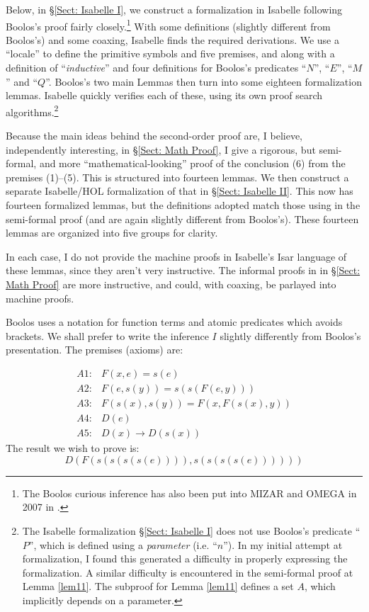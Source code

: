 \documentclass[11pt,a4paper]{article}
\newcommand{\ben}{\begin{equation*}}
\newcommand{\een}{\end{equation*}}
\newcommand{\beqn}{\begin{eqnarray*}}
\newcommand{\eeqn}{\end{eqnarray*}}
\theoremstyle{definition}
\begin{document}
Below, in \S \ref{Sect: Isabelle I}, we construct a formalization in Isabelle following Boolos's proof fairly closely.\footnote{The Boolos curious inference has also been put into MIZAR and OMEGA in 2007 in \cite{ben07}.} With some definitions (slightly different from Boolos's) and some coaxing, Isabelle finds the required derivations. We use a ``locale'' to define the primitive symbols and five premises, and along with a definition of ``\emph{inductive}'' and four definitions for Boolos's predicates ``$N$'', ``$E$'', ``$M$'' and ``$Q$''. Boolos's two main Lemmas then turn into some eighteen formalization lemmas. Isabelle quickly verifies each of these, using its own proof search algorithms.\footnote{The Isabelle formalization \S \ref{Sect: Isabelle I} does not use Boolos's predicate ``$P$'', which is defined using a \emph{parameter} (i.e. ``$n$''). In my initial attempt at formalization, I found this generated a difficulty in properly expressing the formalization. A similar difficulty is encountered in the semi-formal proof at Lemma \ref{lem11}. The subproof for Lemma \ref{lem11} defines a set $A$, which implicitly depends on a parameter.}

Because the main ideas behind the second-order proof are, I believe, independently interesting, in \S \ref{Sect: Math Proof}, I give a rigorous, but semi-formal, and more ``mathematical-looking'' proof of the conclusion (6) from the premises (1)--(5). This is structured into fourteen lemmas. We then construct a separate Isabelle/HOL formalization of that in \S \ref{Sect: Isabelle II}. This now has fourteen formalized lemmas, but the definitions adopted match those using in the semi-formal proof (and are again slightly different from Boolos's). These fourteen lemmas are organized into five groups for clarity. 

In each case, I do not provide the machine proofs in Isabelle's Isar language of these lemmas, since they aren't very instructive. The informal proofs in in \S \ref{Sect: Math Proof} are more instructive, and could, with coaxing, be parlayed into machine proofs.

Boolos uses a notation for function terms and atomic predicates which avoids brackets. We shall prefer to write the inference $I$ slightly differently from Boolos's presentation. The premises (axioms) are:

\beqn
A1: & F(x, e) = s(e)\\
A2: & F(e, s(y)) = s(s(F(e, y)))\\
A3: & F(s(x), s(y)) = F(x, F(s(x), y))\\
A4: & D(e)\\
A5: & D(x) \to D(s(x))
\eeqn
The result we wish to prove is:
\ben
D(F(s(s(s(s(e)))), s(s(s(s(e))))))
\een
\end{document}
